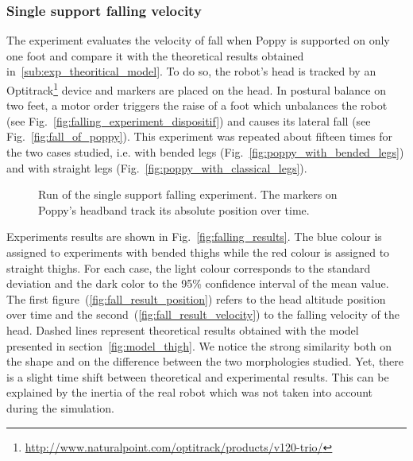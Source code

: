 \subsubsection{Single support falling velocity} %
\label{ssub:falling_velocity}
The experiment evaluates the velocity of fall when Poppy is supported on only one foot and compare it with the theoretical results obtained in~\ref{sub:exp_theoritical_model}. To do so, the robot's head is tracked by an Optitrack\footnote{\url{http://www.naturalpoint.com/optitrack/products/v120-trio/}} device and markers are placed on the head. In postural balance on two feet, a motor order triggers the raise of a foot which unbalances the robot (see Fig.~\ref{fig:falling_experiment_dispositif}) and causes its lateral fall (see Fig.~\ref{fig:fall_of_poppy}). This experiment was repeated about fifteen times for the two cases studied, i.e. with bended legs (Fig.~\ref{fig:poppy_with_bended_legs}) and with straight legs (Fig.~\ref{fig:poppy_with_classical_legs}).

\begin{figure}[ht]
\centering
    \hfil
    \caption{Run of the single support falling experiment.
    The markers on Poppy’s headband track its absolute position over time.}
    \label{fig:falling_experiment}
\end{figure}

Experiments results are shown in Fig.~\ref{fig:falling_results}. The blue colour is assigned to experiments with bended thighs while the red colour is assigned to straight thighs. For each case, the light colour corresponds to the standard deviation and the dark color to the 95\% confidence interval of the mean value. The first figure~(\ref{fig:fall_result_position}) refers to the head altitude position over time and the second~(\ref{fig:fall_result_velocity}) to the falling velocity of the head. Dashed lines represent theoretical results obtained with the model presented in section~\ref{fig:model_thigh}. We notice the strong similarity both on the shape and on the difference between the two morphologies studied. Yet, there is a slight time shift between theoretical and experimental results. This can be explained by the inertia of the real robot which was not taken into account during the simulation.

